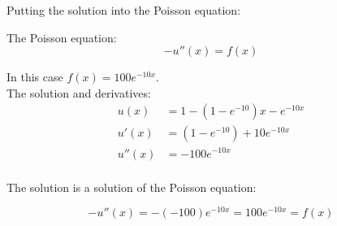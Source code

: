 Putting the solution into the Poisson equation:

The Poisson equation:
\[ -u''(x) = f(x)\]

In this case $f(x) = 100 e^{-10x}$.\\

The solution and derivatives:
\begin{align*}
u(x) &= 1 - \left(1-e^{-10}\right) x - e^{-10x}\\
u'(x) &= \left(1-e^{-10}\right)+ 10 e^{-10x}\\ 
u''(x) &= -100 e^{-10x}\\
\end{align*}

The solution is a solution of the Poisson equation:

\[ -u''(x) = -(-100) e^{-10x} = 100 e^{-10x} = f(x) \]

